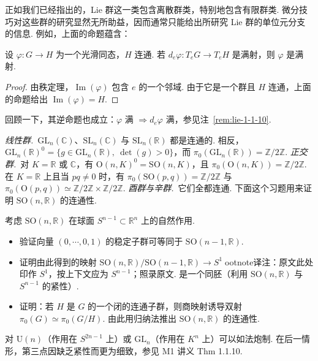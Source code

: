 正如我们已经指出的，Lie 群这一类包含离散群类，特别地包含有限群类. 微分技巧对这些群的研究显然无所助益，因而通常只能给出所研究 Lie 群的单位元分支的信息. 例如，上面的命题蕴含：
\begin{corollary*}
设 $\varphi:G\longrightarrow H$ 为一个光滑同态，$H$ 连通. 若 $d_e\varphi:T_eG\longrightarrow T_eH$ 是满射，则 $\varphi$ 是满射.
\end{corollary*}
\begin{proof}
由秩定理，$\operatorname{Im}(\varphi)$ 包含 $e$ 的一个邻域. 由于它是一个群且 $H$ 连通，上面的命题给出 $\operatorname{Im}(\varphi)=H$.
\end{proof}
回顾一下，其逆命题也成立：$\varphi$ 满 $\Rightarrow d_e\varphi$ 满，参见注~\ref{rem:lie-1-1-10}.
\begin{numpara}[经典群的连通性]\label{np:lie-1-3-2}
\textit{线性群.}\ $\mathrm{GL}_n(\mathbb C)$、$\mathrm{SL}_n(\mathbb C)$ 与 $\mathrm{SL}_n(\mathbb R)$ 都是连通的. 相反，$\mathrm{GL}_n(\mathbb R)^0=\{g\in\mathrm{GL}_n(\mathbb R),\ \det(g)>0\}$，而 $\pi_0(\mathrm{GL}_n(\mathbb R))=\mathbb Z/2\mathbb Z$.
\textit{正交群.}\ 对 $K=\mathbb R$ 或 $\mathbb C$，有 $\mathrm{O}(n,K)^0=\mathrm{SO}(n,K)$，且 $\pi_0(\mathrm{O}(n,K))=\mathbb Z/2\mathbb Z$. 在 $K=\mathbb R$ 上且当 $pq\neq0$ 时，有 $\pi_0(\mathrm{SO}(p,q))=\mathbb Z/2\mathbb Z$ 与 $\pi_0(\mathrm{O}(p,q))\simeq\mathbb Z/2\mathbb Z\times\mathbb Z/2\mathbb Z$.
\textit{酉群与辛群.}\ 它们全都连通.
下面这个习题用来证明 $\mathrm{SO}(n,\mathbb R)$ 的连通性.
\begin{exercise*}
考虑 $\mathrm{SO}(n,\mathbb R)$ 在球面 $S^{n-1}\subset\mathbb R^n$ 上的自然作用.
\begin{itemize}[label=--]
\item 验证向量 $(0,\cdots,0,1)$ 的稳定子群可等同于 $\mathrm{SO}(n-1,\mathbb R)$.
\item 证明由此得到的映射 $\mathrm{SO}(n,\mathbb R)/\mathrm{SO}(n-1,\mathbb R)\longrightarrow S^{1}$ootnote{译注：原文此处印作 $S^{1}$，按上下文应为 $S^{n-1}$；照录原文.} 是一个同胚（利用 $\mathrm{SO}(n,\mathbb R)$ 与 $S^{n-1}$ 的紧性）.
\item 证明：若 $H$ 是 $G$ 的一个闭的连通子群，则商映射诱导双射 $\pi_0(G)\simeq\pi_0(G/H)$. 由此用归纳法推出 $\mathrm{SO}(n,\mathbb R)$ 的连通性.
\end{itemize}
\end{exercise*}
对 $\mathrm{U}(n)$（作用在 $S^{2n-1}$ 上）或 $\mathrm{GL}_n$（作用在 $K^n$ 上）可以如法炮制. 在后一情形，第三点因缺乏紧性而更为细致，参见 M1 讲义 Thm 1.1.10.
\end{numpara}
